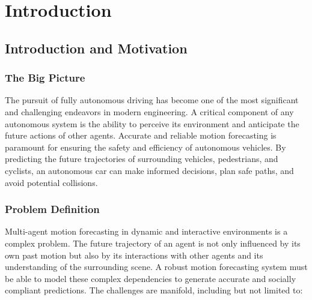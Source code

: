 
\chapter{Introduction} %

\label{Chapter1} %


\section{Introduction and Motivation}

\subsection{The Big Picture}

The pursuit of fully autonomous driving has become one of the most significant and challenging endeavors in modern engineering. A critical component of any autonomous system is the ability to perceive its environment and anticipate the future actions of other agents. Accurate and reliable motion forecasting is paramount for ensuring the safety and efficiency of autonomous vehicles. By predicting the future trajectories of surrounding vehicles, pedestrians, and cyclists, an autonomous car can make informed decisions, plan safe paths, and avoid potential collisions.

\subsection{Problem Definition}

Multi-agent motion forecasting in dynamic and interactive environments is a complex problem. The future trajectory of an agent is not only influenced by its own past motion but also by its interactions with other agents and its understanding of the surrounding scene. A robust motion forecasting system must be able to model these complex dependencies to generate accurate and socially compliant predictions. The challenges are manifold, including but not limited to:

